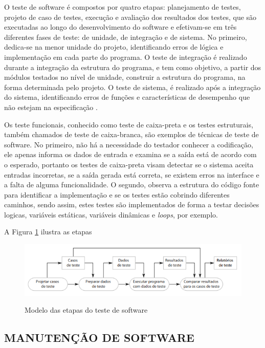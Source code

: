 O teste de software é compostos por quatro etapas: planejamento de testes, projeto de caso de testes, execução e avaliação dos resultados dos testes, que são executadas ao longo do desenvolvimento do software e efetivam-se em três diferentes fases de teste: de unidade, de integração e de sistema. No primeiro, dedica-se na menor unidade do projeto, identificando erros de lógica e implementação em cada parte do programa. O teste de integração é realizado durante a integração da estrutura do programa, e tem como objetivo, a partir dos módulos testados no nível de unidade, construir a estrutura do programa, na forma determinada pelo projeto. O teste de sistema, é realizado após a integração do sistema, identificando erros de funções e características de desempenho que não estejam na especificação \cite{Maldonado2004}.

Os teste funcionais, conhecido como teste de caixa-preta e os testes estruturais, também chamados de teste de caixa-branca, são exemplos de técnicas de teste de software. No primeiro, não há a necessidade do testador conhecer a codificação, ele apenas informa os dados de entrada e examina se a saída está de acordo com o esperado, portanto os testes de caixa-preta visam detectar se o sistema aceita entradas incorretas, se a saída gerada está correta, se existem erros na interface e a falta de alguma funcionalidade. O segundo, observa a estrutura do código fonte para identificar a implementação e se os testes estão cobrindo diferentes caminhos, sendo assim, estes testes são implementados de forma a testar decisões logicas, variáveis estáticas, variáveis dinâmicas e \textit{loops}, por exemplo.\cite{Pedro}

A Figura \ref{fig:figura-modelo-etapas-teste-de-software} ilustra as etapas 
\begin{figure}[!htb]
    \centering
    \caption{Modelo das etapas do teste de software}
    \includegraphics[width=1\textwidth]{./dados/figuras/Modelo_processo_de_software}
    \label{fig:figura-modelo-etapas-teste-de-software}
\end{figure}



\subsection{MANUTENÇÃO DE SOFTWARE}
\label{subsec:manutencaoDeSoftware}

